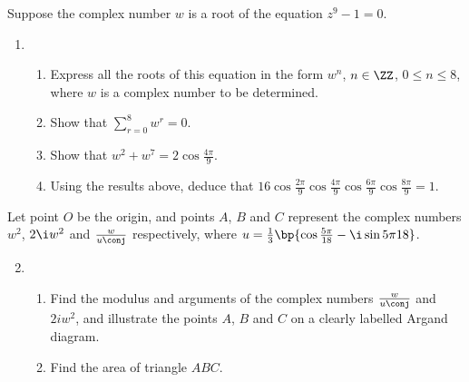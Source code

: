 \begin{problem}
    Suppose the complex number $w$ is a root of the equation $z^9 - 1 = 0$.
    \begin{enumerate}
        \item \begin{enumerate}
            \item Express all the roots of this equation in the form $w^n$, $n \in \ZZ$, $0 \leq n \leq 8$, where $w$ is a complex number to be determined.
            \item Show that $\sum_{r=0}^8 w^r = 0$.
            \item Show that $w^2 + w^7 = 2\cos \frac{4\pi}9$.
            \item Using the results above, deduce that $16\cos\frac{2\pi}9 \cos\frac{4\pi}9 \cos\frac{6\pi}9 \cos\frac{8\pi}9 = 1$.
        \end{enumerate}
    \end{enumerate}

    Let point $O$ be the origin, and points $A$, $B$ and $C$ represent the complex numbers $w^2$, $2\i w^2$ and $\frac{w}{u \conj}$ respectively, where $u = \frac13 \bp{\cos \frac{5\pi}{18} - \i \sin{5\pi}{18}}$.

    \begin{enumerate}
        \setcounter{enumi}{1}
        \item \begin{enumerate}
            \item Find the modulus and arguments of the complex numbers $\frac{w}{u\conj}$ and $2iw^2$, and illustrate the points $A$, $B$ and $C$ on a clearly labelled Argand diagram.
            \item Find the area of triangle $ABC$.
        \end{enumerate}
    \end{enumerate}
\end{problem}
